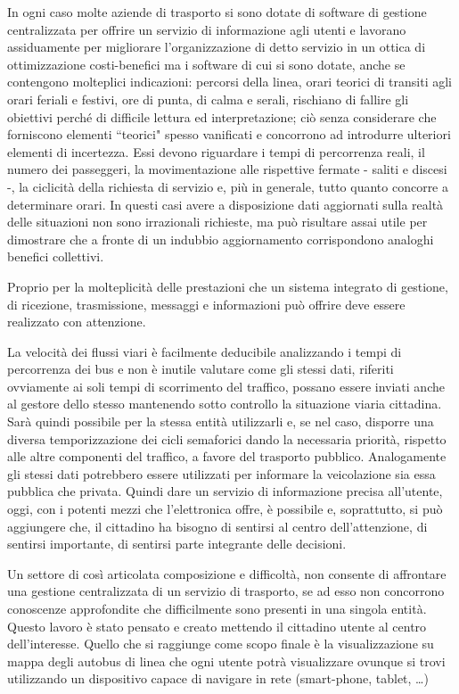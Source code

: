 In ogni caso molte aziende di trasporto si sono dotate di software di gestione centralizzata per offrire un servizio  di informazione agli utenti e lavorano assiduamente per migliorare l’organizzazione di detto servizio in un ottica di ottimizzazione costi-benefici ma i software di cui si sono dotate, anche se contengono molteplici indicazioni: percorsi della linea, orari teorici di transiti agli orari feriali e festivi, ore di punta, di calma e serali, rischiano di fallire gli obiettivi perché di difficile lettura ed interpretazione; ciò senza considerare che forniscono elementi ``teorici" spesso vanificati e concorrono ad introdurre ulteriori elementi di incertezza. Essi devono riguardare i tempi di percorrenza reali, il numero dei passeggeri, la movimentazione alle rispettive fermate - saliti e discesi -, la ciclicità della richiesta di servizio e, più in generale, tutto quanto concorre a determinare orari. In questi casi avere a disposizione dati aggiornati sulla realtà delle situazioni non sono irrazionali richieste, ma può risultare assai utile per dimostrare che a fronte di un indubbio aggiornamento corrispondono analoghi benefici collettivi.

Proprio per la molteplicità delle prestazioni che un sistema integrato di gestione, di ricezione, trasmissione, messaggi e informazioni può offrire deve essere realizzato con attenzione.

La velocità dei flussi viari è facilmente deducibile analizzando i tempi di percorrenza dei bus e non è inutile valutare come gli stessi dati, riferiti ovviamente ai soli tempi di scorrimento del traffico, possano essere inviati anche al gestore dello stesso mantenendo sotto controllo la situazione viaria cittadina. Sarà quindi possibile per la stessa entità utilizzarli e, se nel caso, disporre una diversa temporizzazione dei cicli semaforici dando la necessaria priorità, rispetto alle altre componenti del traffico, a favore del trasporto pubblico.
Analogamente gli stessi dati potrebbero essere utilizzati per informare la veicolazione sia essa pubblica che privata.
Quindi dare un servizio di informazione precisa all’utente, oggi, con i potenti mezzi che l’elettronica offre,  è possibile e, soprattutto, si può aggiungere che, il cittadino ha bisogno di sentirsi al centro dell’attenzione, di sentirsi importante, di sentirsi parte integrante delle decisioni.

Un settore di così articolata composizione e difficoltà, non consente di affrontare una gestione centralizzata di un servizio di trasporto, se ad esso non concorrono conoscenze approfondite che difficilmente sono presenti in una singola entità.
Questo lavoro è stato pensato e creato mettendo il cittadino utente al centro dell’interesse. Quello che si raggiunge come scopo finale è la visualizzazione su mappa degli autobus di linea  che ogni utente potrà visualizzare ovunque si trovi utilizzando un dispositivo capace di navigare in rete (smart-phone, tablet, …)

